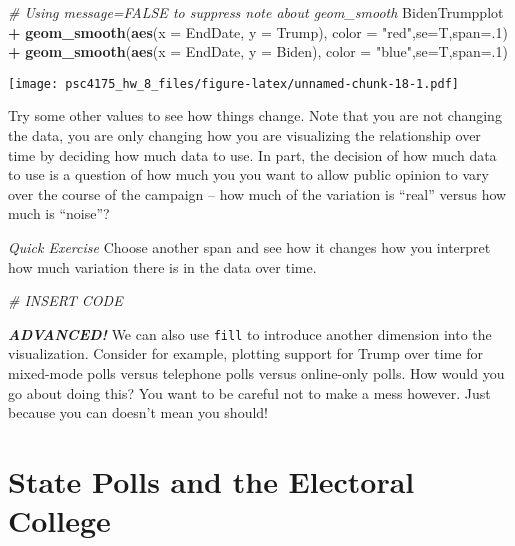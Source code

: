 \documentclass[
]{article}
\newenvironment{Shaded}{\begin{snugshade}}{\end{snugshade}}
\newcommand{\AttributeTok}[1]{\textcolor[rgb]{0.13,0.29,0.53}{#1}}
\newcommand{\CommentTok}[1]{\textcolor[rgb]{0.56,0.35,0.01}{\textit{#1}}}
\newcommand{\DecValTok}[1]{\textcolor[rgb]{0.00,0.00,0.81}{#1}}
\newcommand{\FunctionTok}[1]{\textcolor[rgb]{0.13,0.29,0.53}{\textbf{#1}}}
\newcommand{\NormalTok}[1]{#1}
\newcommand{\SpecialCharTok}[1]{\textcolor[rgb]{0.81,0.36,0.00}{\textbf{#1}}}
\newcommand{\StringTok}[1]{\textcolor[rgb]{0.31,0.60,0.02}{#1}}
\begin{document}
\begin{Shaded}
\begin{Highlighting}[]
\CommentTok{\# Using message=FALSE to suppress note about geom\_smooth}
\NormalTok{BidenTrumpplot }\SpecialCharTok{+}  
  \FunctionTok{geom\_smooth}\NormalTok{(}\FunctionTok{aes}\NormalTok{(}\AttributeTok{x =}\NormalTok{ EndDate, }\AttributeTok{y =}\NormalTok{ Trump), }
              \AttributeTok{color =} \StringTok{"red"}\NormalTok{,}\AttributeTok{se=}\NormalTok{T,}\AttributeTok{span=}\NormalTok{.}\DecValTok{1}\NormalTok{) }\SpecialCharTok{+} 
  \FunctionTok{geom\_smooth}\NormalTok{(}\FunctionTok{aes}\NormalTok{(}\AttributeTok{x =}\NormalTok{ EndDate, }\AttributeTok{y =}\NormalTok{ Biden), }
              \AttributeTok{color =} \StringTok{"blue"}\NormalTok{,}\AttributeTok{se=}\NormalTok{T,}\AttributeTok{span=}\NormalTok{.}\DecValTok{1}\NormalTok{)}
\end{Highlighting}
\end{Shaded}

\texttt{[image: psc4175\_hw\_8\_files/figure-latex/unnamed-chunk-18-1.pdf]}

Try some other values to see how things change. Note that you are not
changing the data, you are only changing how you are visualizing the
relationship over time by deciding how much data to use. In part, the
decision of how much data to use is a question of how much you you want
to allow public opinion to vary over the course of the campaign -- how
much of the variation is ``real'' versus how much is ``noise''?

\emph{Quick Exercise} Choose another span and see how it changes how you
interpret how much variation there is in the data over time.

\begin{Shaded}
\begin{Highlighting}[]
\CommentTok{\# INSERT CODE}
\end{Highlighting}
\end{Shaded}

\textbf{\emph{ADVANCED!}} We can also use \texttt{fill} to introduce
another dimension into the visualization. Consider for example, plotting
support for Trump over time for mixed-mode polls versus telephone polls
versus online-only polls. How would you go about doing this? You want to
be careful not to make a mess however. Just because you can doesn't mean
you should!

\section{State Polls and the Electoral
College}\label{state-polls-and-the-electoral-college}
\end{document}
